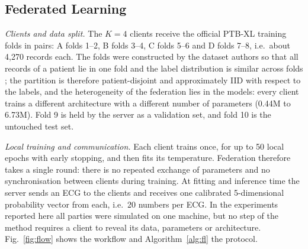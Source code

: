 \subsection{Federated Learning}
\label{sec:fl}

\textit{Clients and data split.} The $K=4$ clients receive the official PTB-XL training folds in
pairs: A folds 1--2, B folds 3--4, C folds 5--6 and D folds 7--8, i.e.\ about 4,270 records each. The
folds were constructed by the dataset authors so that all records of a patient lie in one fold and
the label distribution is similar across folds \cite{wagner2020ptbxl}; the partition is therefore
patient-disjoint and approximately IID with respect to the labels, and the heterogeneity of the
federation lies in the models: every client trains a different architecture with a different number
of parameters (0.44M to 6.73M). Fold 9 is held by the server as a validation set, and fold 10 is the
untouched test set.

\textit{Local training and communication.} Each client trains once, for up to 50 local epochs with
early stopping, and then fits its temperature. Federation therefore takes a single round: there is
no repeated exchange of parameters and no synchronisation between clients during training. At
fitting and inference time the server sends an ECG to the clients and receives one calibrated
5-dimensional probability vector from each, i.e.\ 20 numbers per ECG. In the experiments reported
here all parties were simulated on one machine, but no step of the method requires a client to
reveal its data, parameters or architecture. Fig.~\ref{fig:flow} shows the workflow and
Algorithm~\ref{alg:fl} the protocol.

